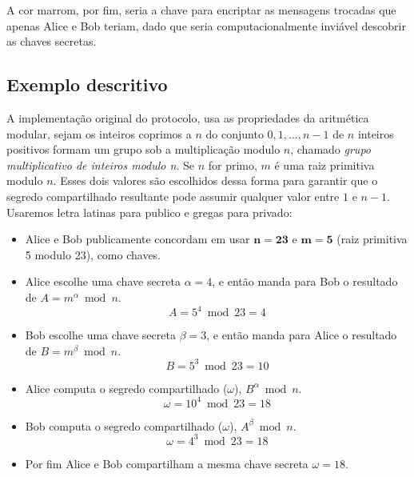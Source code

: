 \documentclass{article}
\begin{document}
A cor marrom, por fim, seria a chave para encriptar as mensagens trocadas que
apenas Alice e Bob teriam, dado que seria computacionalmente inviável descobrir
as chaves secretas.


\subsection{Exemplo descritivo}%
\label{sub:exemplo_descritivo}
A implementação original do protocolo\cite{Diffie}, usa as propriedades da
aritmética modular, sejam os inteiros coprimos a $n$ do conjunto
${0, 1, ..., n-1}$ de $n$ inteiros positivos formam um grupo sob a
multiplicação modulo $n$, chamado \textit{grupo multiplicativo de inteiros
modulo n}. Se $n$ for primo, $m$ é uma raiz primitiva modulo $n$. Esses dois
valores são escolhidos dessa forma para garantir que o segredo compartilhado
resultante pode assumir qualquer valor entre $1$ e $n-1$. Usaremos letra
latinas para publico e gregas para privado:

\begin{itemize}
    \item Alice e Bob publicamente concordam em usar $\boldsymbol{n = 23}$ e
        $\boldsymbol{m = 5}$ (raiz primitiva 5 modulo 23), como chaves.
    \item Alice escolhe uma chave secreta $\alpha=4$, e então manda para Bob o
        resultado de $A = {m}^{\alpha}\bmod n$.
        \begin{equation}
            A = 5^4\bmod23 = 4
        \end{equation}
    \item Bob escolhe uma chave secreta $\beta=3$, e então manda para Alice o
        resultado de $B = {m}^{\beta}\bmod n$.
        \begin{equation}
            B = 5^3\bmod23 = 10
        \end{equation}
    \item Alice computa o segredo compartilhado ($\omega$), $B^\alpha \bmod n$.
        \begin{equation}
            \omega = 10^4\bmod23 = 18
        \end{equation}
    \item Bob computa o segredo compartilhado ($\omega$), $A^\beta \bmod n$.
        \begin{equation}
            \omega = 4^3\bmod23 = 18
        \end{equation}
    \item Por fim Alice e Bob compartilham a mesma chave secreta $\omega = 18$.
\end{itemize}
\end{document}
